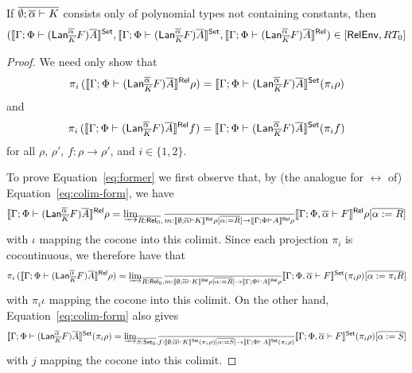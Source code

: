 \documentclass{lmcs}
\theoremstyle{plain}\newtheorem{satz}[thm]{Satz}
\newcommand{\set}{\mathsf{Set}}
\begin{document}
{\begin{prop}
If $\overline{\emptyset; \overline{\alpha} \vdash K}$ consists only of
polynomial types not containing constants, then
\[(\setsem{ \Gamma; \Phi \vdash (\Lan^{\ol \alpha}_{\ol{K}} F)\ol{A}
}, \setsem{ \Gamma; \Phi \vdash (\Lan^{\ol \alpha}_{\ol{K}} F)\ol{A} },
\relsem{ \Gamma; \Phi \vdash (\Lan^{\ol \alpha}_{\ol{K}} F)\ol{A} }) \in
[\relenv,RT_0]\]
\end{prop}
\begin{proof}
We need only show that
\begin{equation}\label{eq:former}
\pi_i \,( \relsem{ \Gamma; \Phi \vdash (\Lan^{\ol \alpha}_{\ol{K}} F)\ol{A}
} \rho ) = \setsem{ \Gamma; \Phi \vdash (\Lan^{\ol \alpha}_{\ol{K}}
  F)\ol{A} } (\pi_i \rho)
\end{equation}
and
\begin{equation}\label{eq:latter}
\pi_i \,( \relsem{ \Gamma; \Phi \vdash (\Lan^{\ol \alpha}_{\ol{K}} F)\ol{A}
} f ) = \setsem{ \Gamma; \Phi \vdash (\Lan^{\ol \alpha}_{\ol{K}}
  F)\ol{A} } (\pi_i f)
\end{equation}
for all $\rho$, $\rho'$, $f : \rho \to \rho'$, and $i \in \{1, 2\}$.

To prove Equation~\ref{eq:former} we first observe that, by (the
analogue for $\rel$ of) Equation~\ref{eq:colim-form}, we have
\[
\llbracket{ \Gamma; \Phi \vdash (\mathsf{Lan}^{\overline{\alpha}}_{\overline{K}} F)\overline{A} }\rrbracket^{\mathsf{Rel}} \rho =
{{\underrightarrow{\lim}}_{\overline{R : \mathsf{Rel}_0},\, \overline{m : \llbracket{ \emptyset; \overline{\alpha} \vdash K }\rrbracket^{\mathsf{Rel}}
    \rho[\overline{\alpha := R}] \to \llbracket{ \Gamma; \Phi \vdash A }\rrbracket^{\mathsf{Rel}}
    \rho}}{ \llbracket{ \Gamma; \Phi, \overline{\alpha} \vdash F }\rrbracket^{\mathsf{Rel}}
  \rho[\overline{\alpha := R}] }}
\]
with $\iota$ mapping the cocone into this colimit.  Since each
projection $\pi_i$ is cocontinuous, we therefore have that
\[
\pi_i\, ( \relsem{ \Gamma; \Phi \vdash (\Lan^{\ol \alpha}_{\ol{K}}
  F)\ol{A} } \rho ) = \colim{\ol{R : \rel_0}, \ol{m : \relsem{
      \emptyset; \ol\alpha \vdash K } \rho[\ol{\alpha := R}] \to
    \relsem{ \Gamma; \Phi \vdash A } \rho}}{ \setsem{ \Gamma; \Phi,
    \ol\alpha \vdash F } (\pi_i \rho) [\ol{\alpha := \pi_i R}]}
\]
with $\pi_i \iota$ mapping the cocone into this colimit.  On the
other hand, Equation~\ref{eq:colim-form} also gives
\[
\setsem{ \Gamma; \Phi \vdash (\Lan^{\ol \alpha}_{\ol{K}} F)\ol{A} }
(\pi_i \rho) = \colim{\ol{S : \set_0}, \ol{f : \setsem{ \emptyset;
      \ol\alpha \vdash K } (\pi_i \rho)[\ol{\alpha := S}] \to \setsem{
      \Gamma; \Phi \vdash A } (\pi_i \rho)}}{ \setsem{ \Gamma; \Phi,
    \ol\alpha \vdash F } (\pi_i \rho) [\ol{\alpha := S}]}
\]
with $j$ mapping the cocone into this colimit.


\end{proof}}
\end{document}
